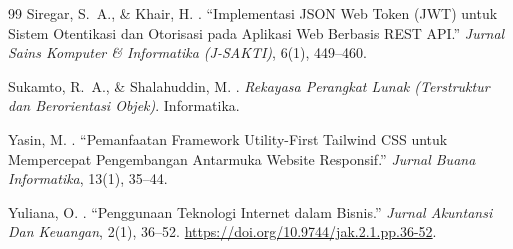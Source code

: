 \documentclass[12pt,a4paper,twocolumn]{article}
\begin{document}
\begin{thebibliography}{99}
Siregar, S.~A., \& Khair, H.
.
\newblock ``Implementasi JSON Web Token (JWT) untuk Sistem Otentikasi dan Otorisasi pada Aplikasi Web Berbasis REST API.''
\newblock \emph{Jurnal Sains Komputer \& Informatika (J-SAKTI)}, 6(1), 449--460.

Sukamto, R.~A., \& Shalahuddin, M.
.
\newblock \emph{Rekayasa Perangkat Lunak (Terstruktur dan Berorientasi Objek)}.
\newblock Informatika.

Yasin, M.
.
\newblock ``Pemanfaatan Framework Utility-First Tailwind CSS untuk Mempercepat Pengembangan Antarmuka Website Responsif.''
\newblock \emph{Jurnal Buana Informatika}, 13(1), 35--44.

Yuliana, O.
.
\newblock ``Penggunaan Teknologi Internet dalam Bisnis.''
\newblock \emph{Jurnal Akuntansi Dan Keuangan}, 2(1), 36--52.
\newblock \url{https://doi.org/10.9744/jak.2.1.pp.36-52}.

\end{thebibliography}
\end{document}
